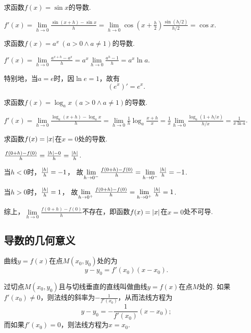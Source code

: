 \begin{example}
求函数\(f(x) = \sin x\)的导数.
\begin{solution}
\(f'(x) = \lim\limits_{h\to0}\frac{\sin(x+h)-\sin x}{h}
= \lim\limits_{h\to0}{\cos(x+\frac{h}{2}) \frac{\sin(h/2)}{h/2}}
= \cos x\).
\end{solution}
\end{example}

\begin{example}
求函数\(f(x) = a^x\ (a > 0 \land a \neq 1)\)的导数.
\begin{solution}
\(f'(x)
= \lim\limits_{h\to0}\frac{a^{x+h}-a^x}{h}
= a^x \lim\limits_{h\to0}\frac{a^h-1}{h}
= a^x \ln a\).
\end{solution}

特别地，当\(a=e\)时，因\(\ln e = 1\)，故有\[
	(e^x)' = e^x.
\]
\end{example}

\begin{example}
求函数\(f(x) = \log_a x\ (a > 0 \land a \neq 1)\)的导数.
\begin{solution}
\(f'(x)
= \lim\limits_{h\to0}\frac{\log_a(x+h)-\log_a x}{h}
= \lim\limits_{h\to0}{\frac{1}{h} \log_a\frac{x+h}{x}}
= \frac{1}{x} \lim\limits_{h\to0}\frac{\log_a(1+h/x)}{h/x}
= \frac{1}{x \ln a}\).
\end{solution}
\end{example}

\begin{example}
求函数\(f(x) = \abs{x}\)在\(x=0\)处的导数.
\begin{solution}
\(\frac{f(0+h)-f(0)}{h} = \frac{\abs{h}-0}{h} = \frac{\abs{h}}{h}\).

当\(h < 0\)时，\(\frac{\abs{h}}{h} = -1\)，
故\(\lim\limits_{h\to0^-}\frac{f(0+h)-f(0)}{h}
= \lim\limits_{h\to0^-}\frac{\abs{h}}{h} = -1\).

当\(h > 0\)时，\(\frac{\abs{h}}{h} = 1\)，
故\(\lim\limits_{h\to0^+}\frac{f(0+h)-f(0)}{h}
= \lim\limits_{h\to0^+}\frac{\abs{h}}{h} = 1\).

综上，\(\lim\limits_{h\to0}\frac{f(0+h)-f(0)}{h}\)不存在，即函数\(f(x) = \abs{x}\)在\(x = 0\)处不可导.
\end{solution}
\end{example}

\subsection{导数的几何意义}
\begin{theorem}
曲线\(y=f(x)\)在点\(M(x_0,y_0)\)处的为\[
	y-y_0=f'(x_0)(x-x_0).
\]

过切点\(M(x_0,y_0)\)且与切线垂直的直线叫做曲线\(y=f(x)\)在点\(M\)处的.
如果\(f'(x_0) \neq 0\)，则法线的斜率为\(-\frac{1}{f'(x_0)}\)，从而法线方程为\[
	y-y_0=-\frac{1}{f'(x_0)}(x-x_0);
\]
而如果\(f'(x_0) = 0\)，则法线方程为\(x = x_0\).
\end{theorem}

